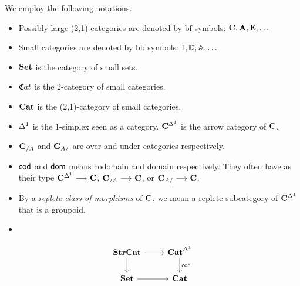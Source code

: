 \documentclass[a4paper,dvipsnames, 11pt]{amsart}
\begin{document}
\maketitle
\cite{Cis19}
\begin{notation}
	We employ the following notations.
	\begin{itemize}
		\item %
			Possibly large (2,1)-categories are denoted by bf symbols:
			$\mathbf{C},\mathbf{A},\mathbf{E},\ldots$
		\item %
			Small categories are denoted by bb symbols:
			$\mathbb{I},\mathbb{D},\mathbb{A},\ldots$
		\item %
			$\mathbf{Set}$ is the category of small sets.
		\item %
			${{\mathfrak{C}}{at}}$ is the 2-category of small categories.
		\item %
			${\mathbf{Cat}}$ is the (2,1)-category of small categories.
		\item %
			${\Delta^1}$ is the $1$-simplex seen as a category.
			$\mathbf{C}^{\Delta^1}$ is the arrow category of $\mathbf{C}$.
		\item %
			$\mathbf{C}_{/A}$ and $\mathbf{C}_{A/}$ are over and under categories respectively.
		\item %
			$\mathsf{cod}$ and $\mathsf{dom}$ means codomain and domain respectively. They often have as their type
			$\C^\ra\arr\C$, $\C_{/A}\arr\C$,
			or $\C_{A/}\arr\C$.
		\item %
			By a \emph{replete class of morphisms} of $\mathbf{C}$, we mean a replete subcategory of $\mathbf{C}^{\Delta^1}$ that is a groupoid.
		\item %
		\qedhere %
	\end{itemize}
\end{notation}
\begin{definition}
	\[
		\begin{tikzcd}
			\StrCat
			\ar[r]
			\ar[d]
				&
				\Cat^\ra
				\ar[d,"\cod"]
			\\
			\Set
			\ar[r]
				&
				\Cat
		\end{tikzcd}
	\]
\end{definition}
\end{document}
